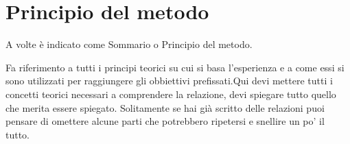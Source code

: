 \section{Principio del metodo}
A volte è indicato come Sommario o Principio del metodo.

Fa riferimento a tutti i principi teorici su cui si basa l'esperienza e a come essi si sono utilizzati per raggiungere gli obbiettivi prefissati.Qui devi mettere tutti i concetti teorici necessari a comprendere la relazione, devi spiegare tutto quello che merita essere spiegato. Solitamente se hai già scritto delle relazioni puoi pensare di omettere alcune parti che potrebbero ripetersi e snellire un po' il tutto.